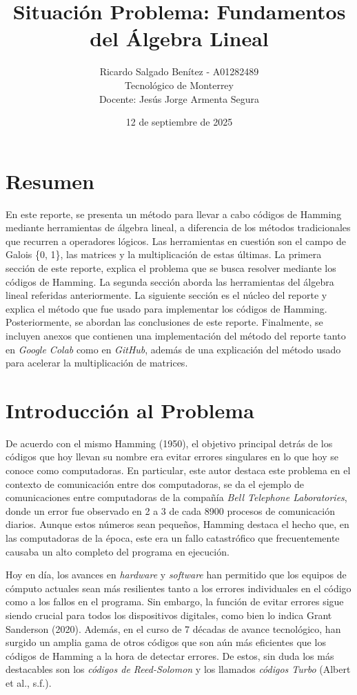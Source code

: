 \documentclass{article}
\title{Situación Problema: Fundamentos del Álgebra Lineal}
\author{Ricardo Salgado Benítez - A01282489 \\ Tecnológico de Monterrey \\ Docente: Jesús Jorge Armenta Segura}
\date{12 de septiembre de 2025}
\begin{document}
\maketitle
\newpage
\section{Resumen}

En este reporte, se presenta un método para llevar a cabo códigos de Hamming mediante herramientas de álgebra lineal, a diferencia de los métodos tradicionales que recurren a operadores lógicos. Las herramientas en cuestión son el campo de Galois \{0, 1\}, las matrices y la multiplicación de estas últimas. La primera sección de este reporte, explica el problema que se busca resolver mediante los códigos de Hamming. La segunda sección aborda las herramientas del álgebra lineal referidas anteriormente. La siguiente sección es el núcleo del reporte y explica el método que fue usado para implementar los códigos de Hamming. Posteriormente, se abordan las conclusiones de este reporte. Finalmente, se incluyen anexos que contienen una implementación del método del reporte tanto en \textit{Google Colab} como en \textit{GitHub}, además de una explicación del método usado para acelerar la multiplicación de matrices.

\section{Introducción al Problema}

De acuerdo con el mismo Hamming (1950), el objetivo principal detrás de los códigos que hoy llevan su nombre era evitar errores singulares en lo que hoy se conoce como computadoras. En particular, este autor destaca este problema en el contexto de comunicación entre dos computadoras, se da el ejemplo de comunicaciones entre computadoras de la compañía \textit{Bell Telephone Laboratories}, donde un error fue observado en 2 a 3 de cada 8900 procesos de comunicación diarios. Aunque estos números sean pequeños, Hamming destaca el hecho que, en las computadoras de la época, este era un fallo catastrófico que frecuentemente causaba un alto completo del programa en ejecución.

Hoy en día, los avances en \textit{hardware} y \textit{software} han permitido que los equipos de cómputo actuales sean más resilientes tanto a los errores individuales en el código como a los fallos en el programa. Sin embargo, la función de evitar errores sigue siendo crucial para todos los dispositivos digitales, como bien lo indica Grant Sanderson (2020). Además, en el curso de 7 décadas de avance tecnológico, han surgido un amplia gama de otros códigos que son aún más eficientes que los códigos de Hamming a la hora de detectar errores. De estos, sin duda los más destacables son los \textit{códigos de Reed-Solomon} y los llamados \textit{códigos Turbo} (Albert et al., s.f.).
\end{document}
